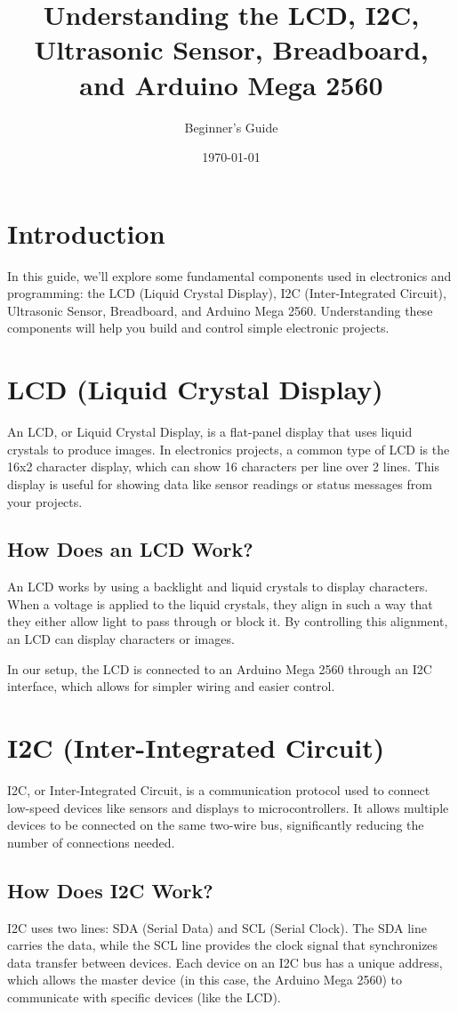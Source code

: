 \documentclass{article}
\title{Understanding the LCD, I2C, Ultrasonic Sensor, Breadboard, and Arduino Mega 2560}
\author{Beginner's Guide}
\date{\today}
\begin{document}
\maketitle

\section{Introduction}
In this guide, we'll explore some fundamental components used in electronics and programming: the LCD (Liquid Crystal Display), I2C (Inter-Integrated Circuit), Ultrasonic Sensor, Breadboard, and Arduino Mega 2560. Understanding these components will help you build and control simple electronic projects.

\section{LCD (Liquid Crystal Display)}
An LCD, or Liquid Crystal Display, is a flat-panel display that uses liquid crystals to produce images. In electronics projects, a common type of LCD is the 16x2 character display, which can show 16 characters per line over 2 lines. This display is useful for showing data like sensor readings or status messages from your projects.

\subsection{How Does an LCD Work?}
An LCD works by using a backlight and liquid crystals to display characters. When a voltage is applied to the liquid crystals, they align in such a way that they either allow light to pass through or block it. By controlling this alignment, an LCD can display characters or images. 

In our setup, the LCD is connected to an Arduino Mega 2560 through an I2C interface, which allows for simpler wiring and easier control.

\section{I2C (Inter-Integrated Circuit)}
I2C, or Inter-Integrated Circuit, is a communication protocol used to connect low-speed devices like sensors and displays to microcontrollers. It allows multiple devices to be connected on the same two-wire bus, significantly reducing the number of connections needed.

\subsection{How Does I2C Work?}
I2C uses two lines: SDA (Serial Data) and SCL (Serial Clock). The SDA line carries the data, while the SCL line provides the clock signal that synchronizes data transfer between devices. Each device on an I2C bus has a unique address, which allows the master device (in this case, the Arduino Mega 2560) to communicate with specific devices (like the LCD).
\end{document}
